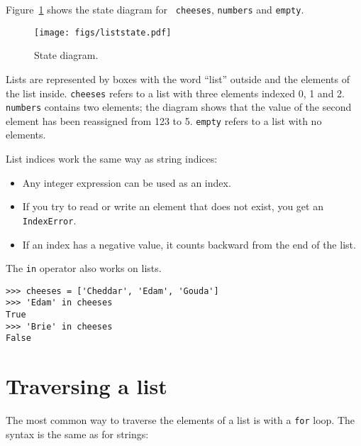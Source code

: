 \documentclass[10pt]{book}
\begin{document}
Figure~\ref{fig.liststate} shows 
the state diagram for {\tt
cheeses}, {\tt numbers} and {\tt empty}.

\begin{figure}
\centerline
{\texttt{[image: figs/liststate.pdf]}}
\caption{State diagram.}
\label{fig.liststate}
\end{figure}

Lists are represented by boxes with the word ``list'' outside
and the elements of the list inside.  {\tt cheeses} refers to
a list with three elements indexed 0, 1 and 2.
{\tt numbers} contains two elements; the diagram shows that the
value of the second element has been reassigned from 123 to 5.
{\tt empty} refers to a list with no elements.

List indices work the same way as string indices:

\begin{itemize}

\item Any integer expression can be used as an index.

\item If you try to read or write an element that does not exist, you
get an {\tt IndexError}.

\item If an index has a negative value, it counts backward from the
end of the list.

\end{itemize}


The {\tt in} operator also works on lists.

\begin{verbatim}
>>> cheeses = ['Cheddar', 'Edam', 'Gouda']
>>> 'Edam' in cheeses
True
>>> 'Brie' in cheeses
False
\end{verbatim}


\section{Traversing a list}

The most common way to traverse the elements of a list is
with a {\tt for} loop.  The syntax is the same as for strings:
\end{document}

